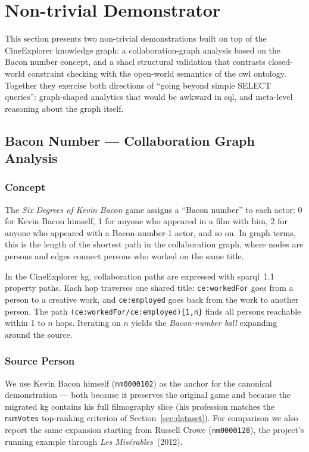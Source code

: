 \section{Non-trivial Demonstrator}
\label{sec:demonstrator}

This section presents two non-trivial demonstrations built on top of the CineExplorer knowledge graph: a collaboration-graph analysis based on the Bacon number concept, and a \ac{shacl} structural validation that contrasts closed-world constraint checking with the open-world semantics of the \ac{owl} ontology. Together they exercise both directions of ``going beyond simple SELECT queries'': graph-shaped analytics that would be awkward in \ac{sql}, and meta-level reasoning about the graph itself.

\subsection{Bacon Number --- Collaboration Graph Analysis}

\subsubsection{Concept}

The \emph{Six Degrees of Kevin Bacon} game assigns a ``Bacon number'' to each actor: 0 for Kevin Bacon himself, 1 for anyone who appeared in a film with him, 2 for anyone who appeared with a Bacon-number-1 actor, and so on. In graph terms, this is the length of the shortest path in the collaboration graph, where nodes are persons and edges connect persons who worked on the same title.

In the CineExplorer \ac{kg}, collaboration paths are expressed with \ac{sparql}~1.1 property paths. Each hop traverses one shared title: \texttt{ce:workedFor} goes from a person to a creative work, and \texttt{ce:employed} goes back from the work to another person. The path \texttt{(ce:workedFor/ce:employed)\{1,n\}} finds all persons reachable within 1 to $n$ hops. Iterating on $n$ yields the \emph{Bacon-number ball} expanding around the source.

\subsubsection{Source Person}

We use Kevin Bacon himself (\texttt{nm0000102}) as the anchor for the canonical demonstration --- both because it preserves the original game and because the migrated \ac{kg} contains his full filmography slice (his profession matches the \texttt{numVotes} top-ranking criterion of Section~\ref{sec:dataset}). For comparison we also report the same expansion starting from Russell Crowe (\texttt{nm0000128}), the project's running example through \emph{Les Mis\'{e}rables}~(2012).

